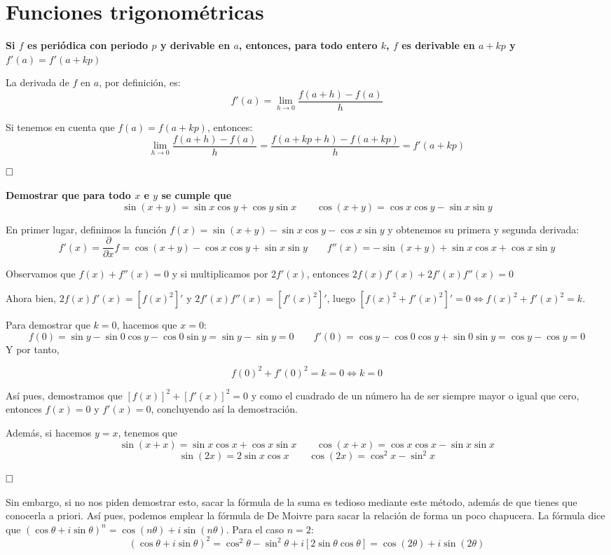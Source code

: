 \documentclass[a4paper]{article}
\newcommand{\parfrac}[1]{\frac{\partial}{\partial {#1}}}
\newcommand{\qed}{\begin{flushright}
		{$\newline\square$}
	\end{flushright}}
\begin{document}
\section{Funciones trigonométricas}
\textbf{Si $f$ es periódica con periodo $p$ y derivable en $a$, entonces, para todo entero $k$, $f$ es derivable en $a+kp$ y $f'(a) = f'(a+kp)$}


La derivada de $f$ en $a$, por definición, es:
$$f'(a) = \lim_{h\rightarrow0}\frac{f(a+h) - f(a)}{h}$$

Si tenemos en cuenta que $f(a) = f(a+kp)$, entonces:
$$\lim_{h\rightarrow0}\frac{f(a+h)-f(a)}{h} = \frac{f(a+kp+h)-f(a+kp)}{h} = f'(a+kp)$$\qed


\textbf{Demostrar que para todo $x$ e $y$ se cumple que}
$$\sin(x+y) = \sin x\cos y  + \cos y \sin x \qquad \cos(x+y) = \cos x \cos y - \sin x \sin y$$

En primer lugar, definimos la función $f(x) = \sin(x+y) - \sin x\cos y - \cos x \sin y$ y obtenemos su primera y segunda derivada:
$$f'(x) = \parfrac{x}f = \cos(x+y)-\cos x \cos y +\sin x \sin y \qquad f''(x) = -\sin(x+y)+\sin x \cos x + \cos x \sin y$$

Observamos que $f(x) + f''(x) = 0$ y si multiplicamos por $2f'(x)$, entonces $2f(x)f'(x) + 2f'(x)f''(x) = 0$

Ahora bien, $2f(x)f'(x) = [f(x)^2]'$ y $2f'(x)f''(x) = [f'(x)^2]'$, luego $[f(x)^2 + f'(x)^2]' = 0 \iff f(x)^2 + f'(x)^2 = k$.

Para demostrar que $k = 0$, hacemos que $x = 0$:
$$f(0) = \sin y - \sin0\cos y - \cos 0 \sin y = \sin y - \sin y = 0 \qquad f'(0) = \cos y - \cos 0 \cos y + \sin 0 \sin y = \cos y - \cos y = 0$$
Y por tanto, 

$$f(0)^2 + f'(0)^2 = k = 0 \iff k = 0$$

Así pues, demostramos que $[f(x)]^2 + [f'(x)]^2 = 0$ y como el cuadrado de un número ha de ser siempre mayor o igual que cero, entonces $f(x) = 0$ y $f'(x) = 0$, concluyendo así la demostración.

Además, si hacemos $y = x$, tenemos que 
$$\sin(x+x) = \sin x\cos x  + \cos x \sin x \qquad \cos(x+x) = \cos x \cos x - \sin x \sin x$$
$$\sin(2x) = 2\sin x\cos x    \qquad \cos(2x) =  \cos^2 x - \sin^2 x$$\qed

Sin embargo, si no nos piden demostrar esto, sacar la fórmula de la suma es tedioso mediante este método, además de que tienes que conocerla a priori. Así pues, podemos emplear la fórmula de De Moivre para sacar la relación de forma un poco chapucera. La fórmula dice que $(\cos\theta + i\sin\theta)^n = \cos(n\theta) + i \sin(n\theta)$. Para el caso $n=2$:
$$(\cos\theta + i\sin\theta)^2 = \cos^2\theta - \sin^2\theta + i[2\sin\theta\cos\theta]  = \cos(2\theta) + i \sin(2\theta)$$
\end{document}
